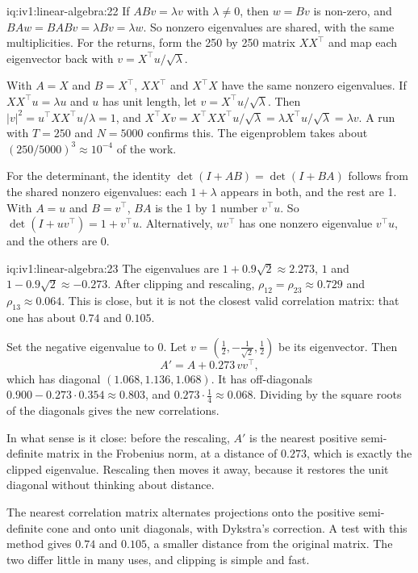 \begin{solution}{iq:iv1:linear-algebra:22}
If $ABv = \lambda v$ with $\lambda \ne 0$, then $w = Bv$ is non-zero, and $BAw = BABv = \lambda Bv = \lambda w$. So nonzero eigenvalues are shared, with the same multiplicities. For the returns, form the 250 by 250 matrix $XX^\top$ and map each eigenvector back with $v = X^\top u/\sqrt{\lambda}$.

With $A = X$ and $B = X^\top$, $XX^\top$ and $X^\top X$ have the same nonzero eigenvalues. If $XX^\top u = \lambda u$ and $u$ has unit length, let $v = X^\top u/\sqrt{\lambda}$. Then $|v|^2 = u^\top XX^\top u/\lambda = 1$, and $X^\top Xv = X^\top XX^\top u/\sqrt{\lambda} = \lambda X^\top u/\sqrt{\lambda} = \lambda v$. A run with $T = 250$ and $N = 5000$ confirms this. The eigenproblem takes about $(250/5000)^3 \approx 10^{-4}$ of the work.

For the determinant, the identity $\det(I + AB) = \det(I + BA)$ follows from the shared nonzero eigenvalues: each $1 + \lambda$ appears in both, and the rest are 1. With $A = u$ and $B = v^\top$, $BA$ is the 1 by 1 number $v^\top u$. So $\det(I + uv^\top) = 1 + v^\top u$. Alternatively, $uv^\top$ has one nonzero eigenvalue $v^\top u$, and the others are 0.

\end{solution}

\begin{solution}{iq:iv1:linear-algebra:23}
The eigenvalues are $1 + 0.9\sqrt{2} \approx 2.273$, $1$ and $1 - 0.9\sqrt{2} \approx -0.273$. After clipping and rescaling, $\rho_{12} = \rho_{23} \approx 0.729$ and $\rho_{13} \approx 0.064$. This is close, but it is not the closest valid correlation matrix: that one has about $0.74$ and $0.105$.

Set the negative eigenvalue to 0. Let $v = (\tfrac12, -\tfrac{1}{\sqrt{2}}, \tfrac12)$ be its eigenvector. Then
\[
A' = A + 0.273\,vv^\top,
\]
which has diagonal $(1.068, 1.136, 1.068)$. It has off-diagonals $0.900 - 0.273 \cdot 0.354 \approx 0.803$, and $0.273 \cdot \tfrac14 \approx 0.068$. Dividing by the square roots of the diagonals gives the new correlations.

In what sense is it close: before the rescaling, $A'$ is the nearest positive semi-definite matrix in the Frobenius norm, at a distance of $0.273$, which is exactly the clipped eigenvalue. Rescaling then moves it away, because it restores the unit diagonal without thinking about distance.

The nearest correlation matrix alternates projections onto the positive semi-definite cone and onto unit diagonals, with Dykstra's correction. A test with this method gives $0.74$ and $0.105$, a smaller distance from the original matrix. The two differ little in many uses, and clipping is simple and fast.

\end{solution}

